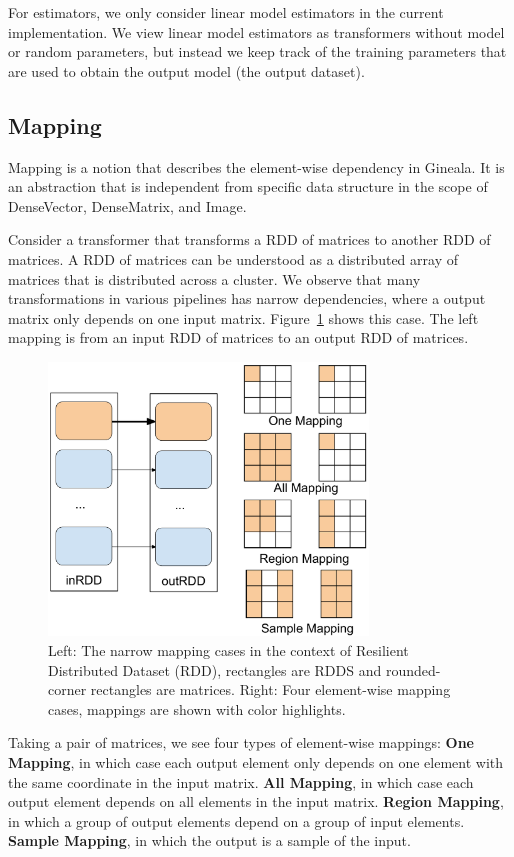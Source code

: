 \documentclass{sig-alternate}
\begin{document}
For estimators, we only consider linear model estimators in the current implementation. 
We view linear model estimators as transformers without model or random parameters, 
but instead we keep track of the training parameters that are used to obtain the output model (the output dataset). 

\subsection{Mapping}
\label{sec:Design-Mapping}
Mapping is a notion that describes the element-wise dependency in Gineala. 
It is an abstraction that is independent from specific data structure in the scope of DenseVector, DenseMatrix, and Image.

Consider a transformer that transforms a RDD of matrices to another RDD of matrices.
A RDD of matrices can be understood as a distributed array of matrices that is distributed across a cluster.
We observe that many transformations in various pipelines has narrow dependencies, where a output matrix
only depends on one input matrix. Figure~\ref{fig:narrowmapping} shows this case. 
The left mapping is from an input RDD of matrices to an output RDD of matrices. 

\begin{figure}[h]
\begin{center}
    \includegraphics[width=85mm]{pictures/narrowmapping}
\caption {Left: The narrow mapping cases in the context of Resilient Distributed Dataset (RDD), rectangles are RDDS and rounded-corner rectangles are matrices.
Right: Four element-wise mapping cases, mappings are shown with color highlights.
    \label{fig:narrowmapping}
}
\end{center}
\end{figure}

Taking a pair of matrices, we see four types of element-wise mappings: 
{\bf One Mapping}, in which case each output element only depends on one element with the same coordinate in the input matrix.
{\bf All Mapping}, in which case each output element depends on all elements in the input matrix.
{\bf Region Mapping}, in which a group of output elements depend on a group of input elements.
{\bf Sample Mapping}, in which the output is a sample of the input.
\end{document}
